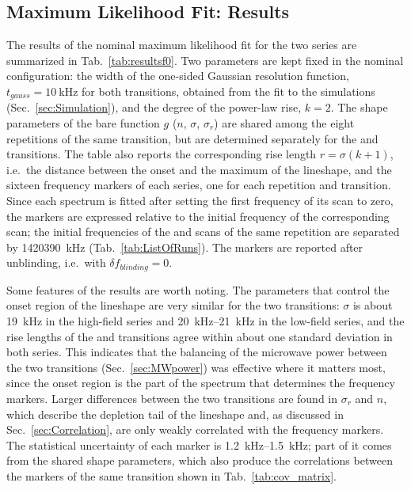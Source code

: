 \subsection{Maximum Likelihood Fit: Results}

The results of the nominal maximum likelihood fit for the two series are summarized in Tab.~\ref{tab:resultsf0}. Two parameters are kept fixed in the nominal configuration: the width of the one-sided Gaussian resolution function, $t_{gauss} = \SI{10}{\kilo\hertz}$ for both transitions, obtained from the fit to the simulations (Sec.~\ref{sec:Simulation}), and the degree of the power-law rise, $k=2$. The shape parameters of the bare function $g$ ($n$, $\sigma$, $\sigma_r$) are shared among the eight repetitions of the same transition, but are determined separately for the \cb and \da transitions. The table also reports the corresponding rise length $r = \sigma (k+1)$, i.e.\ the distance between the onset and the maximum of the lineshape, and the sixteen frequency markers of each series, one for each repetition and transition. Since each spectrum is fitted after setting the first frequency of its scan to zero, the markers are expressed relative to the initial frequency of the corresponding scan; the initial frequencies of the \cb and \da scans of the same repetition are separated by \SI{1420390}{\kilo\hertz} (Tab.~\ref{tab:ListOfRuns}). The \da markers are reported after unblinding, i.e.\ with $\delta f_{blinding} = 0$.

Some features of the results are worth noting. The parameters that control the onset region of the lineshape are very similar for the two transitions: $\sigma$ is about \SI{19}{\kilo\hertz} in the high-field series and \SIrange{20}{21}{\kilo\hertz} in the low-field series, and the rise lengths of the \cb and \da transitions agree within about one standard deviation in both series. This indicates that the balancing of the microwave power between the two transitions (Sec.~\ref{sec:MWpower}) was effective where it matters most, since the onset region is the part of the spectrum that determines the frequency markers. Larger differences between the two transitions are found in $\sigma_r$ and $n$, which describe the depletion tail of the lineshape and, as discussed in Sec.~\ref{sec:Correlation}, are only weakly correlated with the frequency markers. The statistical uncertainty of each marker is \SIrange{1.2}{1.5}{\kilo\hertz}; part of it comes from the shared shape parameters, which also produce the correlations between the markers of the same transition shown in Tab.~\ref{tab:cov_matrix}.

